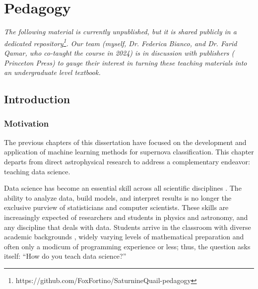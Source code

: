 \chapter{Pedagogy}\label{ch:pedagogy}
\noindent\emph{The following material is currently unpublished, but it is shared publicly in a dedicated repository\footnote{https://github.com/FoxFortino/SaturnineQuail-pedagogy}. Our team (myself, Dr. Federica Bianco, and Dr. Farid Qamar, who co-taught the course in 2024) is in discussion with publishers (\ie{} Princeton Press) to gauge their interest in turning these teaching materials into an undergraduate level textbook.}
\section{Introduction}\label{ch:pedagogy:intro}

\subsection{Motivation}
The previous chapters of this dissertation have focused on the development and application of machine learning methods for supernova classification. This chapter departs from direct astrophysical research to address a complementary endeavor: teaching data science.

Data science has become an essential skill across all scientific disciplines \cite{hey_fourth_2009,porcu_data_2026,vinuesa_decoding_2026,antonucci_data_2023,fu_ai_2026,hersh_beyond_2023,longo_data_2014,kang_cultivating_2026,bednarowska-michaiel_bringing_2026,zarefard_essential_2024,dong_are_2026,gunklach_beyond_2025}. The ability to analyze data, build models, and interpret results is no longer the exclusive purview of statisticians and computer scientists. These skills are increasingly expected of researchers and students in physics and astronomy, and any discipline that deals with data. Students arrive in the classroom with diverse academic backgrounds \cite{bednarowska-michaiel_bringing_2026,inproceedings}, widely varying levels of mathematical preparation and often only a modicum of programming experience or less; thus, the question asks itself: ``How do you teach data science?''

